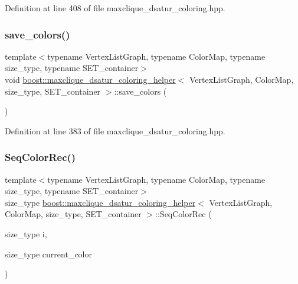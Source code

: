 Definition at line 408 of file maxclique\+\_\+dsatur\+\_\+coloring.\+hpp.

\mbox{\label{classboost_1_1maxclique__dsatur__coloring__helper_a3920546347f3636ed6600e846676fedd}} 
\subsubsection{\texorpdfstring{save\+\_\+colors()}{save\_colors()}}
{\footnotesize\ttfamily template$<$typename Vertex\+List\+Graph, typename Color\+Map, typename size\+\_\+type, typename S\+E\+T\+\_\+container$>$ \\
void \hyperlink{classboost_1_1maxclique__dsatur__coloring__helper}{boost\+::maxclique\+\_\+dsatur\+\_\+coloring\+\_\+helper}$<$ Vertex\+List\+Graph, Color\+Map, size\+\_\+type, S\+E\+T\+\_\+container $>$\+::save\+\_\+colors (\begin{DoxyParamCaption}{ }\end{DoxyParamCaption})\hspace{0.3cm}{\ttfamily [inline]}}



Definition at line 383 of file maxclique\+\_\+dsatur\+\_\+coloring.\+hpp.

\mbox{\label{classboost_1_1maxclique__dsatur__coloring__helper_a5bd2cf2e839d9d424e788efec7a4dd60}} 
\subsubsection{\texorpdfstring{Seq\+Color\+Rec()}{SeqColorRec()}}
{\footnotesize\ttfamily template$<$typename Vertex\+List\+Graph, typename Color\+Map, typename size\+\_\+type, typename S\+E\+T\+\_\+container$>$ \\
size\+\_\+type \hyperlink{classboost_1_1maxclique__dsatur__coloring__helper}{boost\+::maxclique\+\_\+dsatur\+\_\+coloring\+\_\+helper}$<$ Vertex\+List\+Graph, Color\+Map, size\+\_\+type, S\+E\+T\+\_\+container $>$\+::Seq\+Color\+Rec (\begin{DoxyParamCaption}\item[{size\+\_\+type}]{i,  }\item[{size\+\_\+type}]{current\+\_\+color }\end{DoxyParamCaption})\hspace{0.3cm}{\ttfamily [inline]}}



